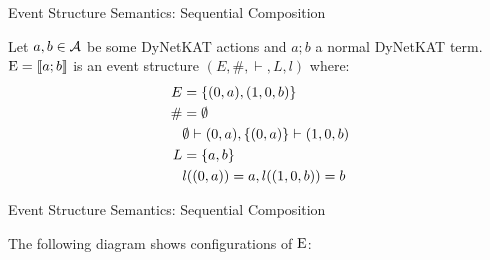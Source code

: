 \begin{frame}{Event Structure Semantics: Sequential Composition}
    \begin{example}
        Let $a,b\in \mathcal{A}$ be some DyNetKAT actions and $a;b$ a
        normal DyNetKAT term.
        $\mathrm{E} = \llbracket a;b \rrbracket$ is an event structure
        $(E,\#,\vdash,L,l)$ where:
        \begin{align*}
            E  & = \{(0,a),(1,0,b)\}                       \\
            \# & = \emptyset                               \\
               & \emptyset \vdash (0,a), \{(0,a)\} \vdash (1,0,b) \\
            L  & = \{a,b\}                                 \\
               & l((0,a)) = a, l((1,0,b)) = b
        \end{align*}
    \end{example}
\end{frame}

\begin{frame}{Event Structure Semantics: Sequential Composition}
    \begin{example}
        The following diagram shows configurations of $\mathrm{E}$:
        \begin{center}
        \end{center}
    \end{example}
\end{frame}

